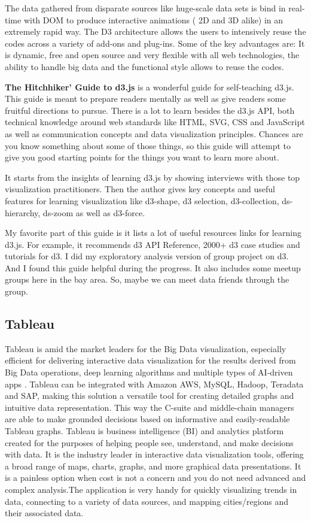 \documentclass[]{book}
\theoremstyle{definition}
\theoremstyle{definition}
\theoremstyle{definition}
\theoremstyle{remark}
\begin{document}
The data gathered from disparate sources like huge-scale data sets is
bind in real-time with DOM to produce interactive animations ( 2D and 3D
alike) in an extremely rapid way. The D3 architecture allows the users
to intensively reuse the codes across a variety of add-ons and plug-ins.
Some of the key advantages are: It is dynamic, free and open source and
very flexible with all web technologies, the ability to handle big data
and the functional style allows to reuse the codes.

\textbf{The Hitchhiker' Guide to d3.js} is a wonderful guide for
self-teaching d3.js. This guide is meant to prepare readers mentally as
well as give readers some fruitful directions to pursue. There is a lot
to learn besides the d3.js API, both technical knowledge around web
standards like HTML, SVG, CSS and JavaScript as well as communication
concepts and data visualization principles. Chances are you know
something about some of those things, so this guide will attempt to give
you good starting points for the things you want to learn more about.

It starts from the insights of learning d3.js by showing interviews with
those top visualization practitioners. Then the author gives key
concepts and useful features for learning visualization like d3-shape,
d3 selection, d3-collection, ds-hierarchy, ds-zoom as well as d3-force.

My favorite part of this guide is it lists a lot of useful resources
links for learning d3.js. For example, it recommends d3 API Reference,
2000+ d3 case studies and tutorials for d3. I did my exploratory
analysis version of group project on d3. And I found this guide helpful
during the progress. It also includes some meetup groups here in the bay
area. So, maybe we can meet data friends through the group.

\subsection{Tableau}\label{tableau}

Tableau is amid the market leaders for the Big Data visualization,
especially efficient for delivering interactive data visualization for
the results derived from Big Data operations, deep learning algorithms
and multiple types of AI-driven apps \citep{tableau_interactive_viz}.
Tableau can be integrated with Amazon AWS, MySQL, Hadoop, Teradata and
SAP, making this solution a versatile tool for creating detailed graphs
and intuitive data representation. This way the C-suite and middle-chain
managers are able to make grounded decisions based on informative and
easily-readable Tableau graphs. Tableau is business intelligence (BI)
and analytics platform created for the purposes of helping people see,
understand, and make decisions with data. It is the industry leader in
interactive data visualization tools, offering a broad range of maps,
charts, graphs, and more graphical data presentations. It is a painless
option when cost is not a concern and you do not need advanced and
complex analysis.The application is very handy for quickly visualizing
trends in data, connecting to a variety of data sources, and mapping
cities/regions and their associated data.
\end{document}
